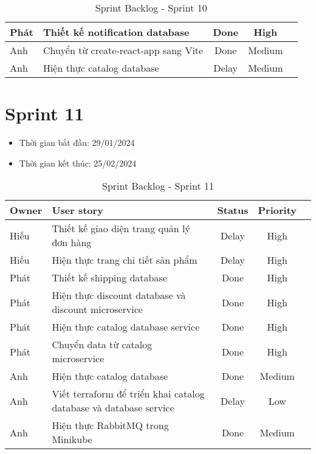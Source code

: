 \begin{table}[H]
\begin{tabular}{|m{2.5cm}|m{9cm}|c|c|c|}
    Phát              & Thiết kế notification database                   & Done                              & High         \\ \hline
    Anh               & Chuyển từ create-react-app sang Vite                   & Done                              & Medium         \\ \hline
    Anh               & Hiện thực catalog database                   & Delay                              & Medium         \\ \hline
    \end{tabular}
    \caption{Sprint Backlog - Sprint 10}
    \label{tab:sprint-10}
\end{table}
\section{Sprint 11}
\begin{itemize}
    \item Thời gian bắt đầu: 29/01/2024
    \item Thời gian kết thúc: 25/02/2024
\end{itemize}
\begin{table}[H]
    \begin{tabular}{|m{2.5cm}|m{9cm}|c|c|c|}
    \hline
    \textbf{Owner}  & \textbf{User story}                                & \textbf{Status}  & \textbf{Priority} \\ \hline
    Hiếu               & Thiết kế giao diện trang quản lý đơn hàng                    & Delay                              & High         \\ \hline
    Hiếu              & Hiện thực trang chi tiết sản phẩm                     & Delay                              & High         \\ \hline
    Phát               & Thiết kế shipping database                    & Done                              & High         \\ \hline
    Phát              & Hiện thực discount database và discount microservice                  & Done                              & High         \\ \hline
    Phát              & Hiện thực catalog database service                   & Done                              & High         \\ \hline
    Phát              & Chuyển data từ catalog microservice                   & Done                              & High         \\ \hline
    Anh              & Hiện thực catalog database                   & Done                              & Medium         \\ \hline
    Anh              & Viết terraform để triển khai catalog database và database service                   & Delay                              & Low         \\ \hline
    Anh              & Hiện thực RabbitMQ trong Minikube                   & Done                              & Medium         \\ \hline
    \end{tabular}
    \caption{Sprint Backlog - Sprint 11}
    \label{tab:sprint-11}
\end{table}
